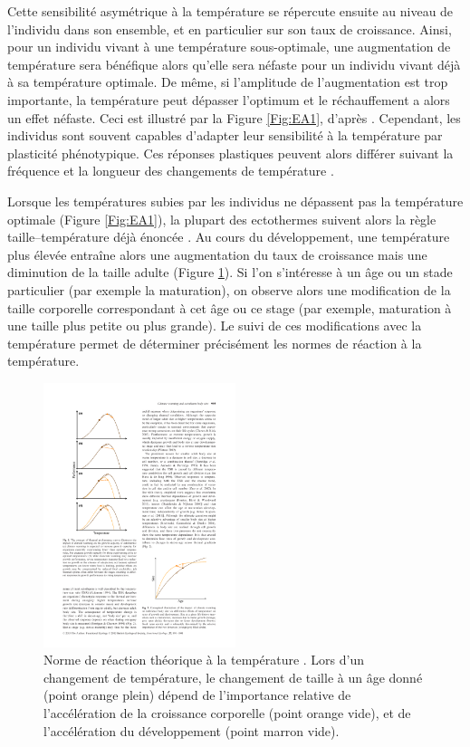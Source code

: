 Cette sensibilité asymétrique à la température se répercute ensuite au niveau
de l'individu dans son ensemble, et en particulier sur son taux de croissance.
Ainsi, pour un individu vivant à une température sous-optimale, une augmentation
de température sera bénéfique alors qu'elle sera néfaste pour un individu vivant
déjà à sa température optimale. De même, si l'amplitude de l'augmentation est
trop importante, la température peut dépasser l'optimum et le réchauffement a
alors un effet néfaste. Ceci est illustré par la Figure
\ref{Fig:EA1}, d'après \textcites{ohlberger2013a}. Cependant, les individus sont
souvent capables d'adapter leur sensibilité à la température par plasticité
phénotypique. Ces réponses plastiques peuvent alors différer suivant la
fréquence et la longueur des changements de température
\autocites{angilletta2009a, huey1999a}.

Lorsque les températures subies par les individus ne dépassent pas la
température optimale (Figure \ref{Fig:EA1}), la plupart des ectothermes suivent
alors la règle taille--température déjà énoncée \autocite{atkinson1994a}. Au
cours du développement, une température plus élevée entraîne alors une augmentation du
taux de croissance mais une diminution de la taille adulte (Figure
\ref{Fig:EA2}).
Si l'on s'intéresse à un âge ou un stade particulier (par exemple la
maturation), on observe alors une modification de la taille corporelle
correspondant à cet âge ou ce stage (par exemple, maturation à une taille plus
petite ou plus grande). Le suivi de ces modifications avec la
température permet de déterminer précisément les normes de réaction à la
température.

\begin{figure}[!ht] %
\centering
\includegraphics[width=0.5\textwidth]{1_CorpsDeThese/EA/Fig/ThermalNorm}
\caption[
Norme de réaction à la température]{Norme de réaction théorique à la
température \autocites[Figure 2]{ohlberger2013a}. Lors d'un changement de
température, le changement de taille à un âge donné (point orange plein) dépend
de l'importance relative de l'accélération de la croissance corporelle (point
orange vide), et de l'accélération du développement (point marron vide).}
\label{Fig:EA2}
\end{figure}

